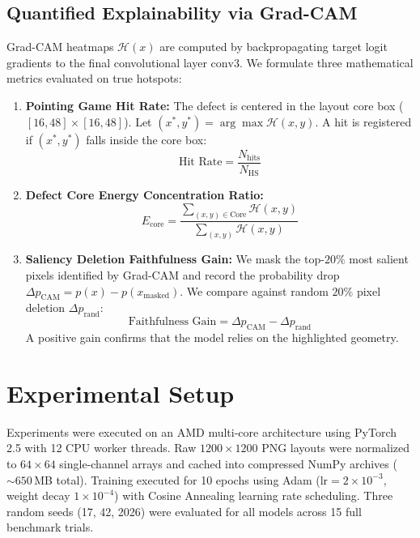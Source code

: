 \documentclass[11pt,journal,onecolumn]{IEEEtran}
\begin{document}
\subsection{Quantified Explainability via Grad-CAM}
Grad-CAM heatmaps $\mathcal{H}(x)$ are computed by backpropagating target logit gradients to the final convolutional layer $\text{conv3}$. We formulate three mathematical metrics evaluated on true hotspots:
\begin{enumerate}
    \item \textbf{Pointing Game Hit Rate:} The defect is centered in the layout core box ($[16, 48] \times [16, 48]$). Let $(x^*, y^*) = \arg\max \mathcal{H}(x, y)$. A hit is registered if $(x^*, y^*)$ falls inside the core box:
    \begin{equation}
    \text{Hit Rate} = \frac{N_{\text{hits}}}{N_{\text{HS}}}
    \end{equation}
    \item \textbf{Defect Core Energy Concentration Ratio:}
    \begin{equation}
    E_{\text{core}} = \frac{\sum_{(x,y) \in \text{Core}} \mathcal{H}(x, y)}{\sum_{(x,y)} \mathcal{H}(x, y)}
    \end{equation}
    \item \textbf{Saliency Deletion Faithfulness Gain:} We mask the top-$20\%$ most salient pixels identified by Grad-CAM and record the probability drop $\Delta p_{\text{CAM}} = p(x) - p(x_{\text{masked}})$. We compare against random $20\%$ pixel deletion $\Delta p_{\text{rand}}$:
    \begin{equation}
    \text{Faithfulness Gain} = \Delta p_{\text{CAM}} - \Delta p_{\text{rand}}
    \end{equation}
    A positive gain confirms that the model relies on the highlighted geometry.
\end{enumerate}

\section{Experimental Setup}
Experiments were executed on an AMD multi-core architecture using PyTorch 2.5 with 12 CPU worker threads. Raw $1200 \times 1200$ PNG layouts were normalized to $64 \times 64$ single-channel arrays and cached into compressed NumPy archives ($\sim 650$\,MB total). Training executed for 10 epochs using Adam ($\text{lr} = 2 \times 10^{-3}$, weight decay $1 \times 10^{-4}$) with Cosine Annealing learning rate scheduling. Three random seeds (17, 42, 2026) were evaluated for all models across 15 full benchmark trials.
\end{document}
